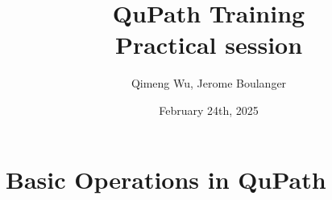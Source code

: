 \documentclass[a4paper,DIV=17,dvipsnames,headsepline]{scrartcl}
\begin{document}
\title{QuPath Training\\Practical session}

\author{Qimeng Wu, Jerome Boulanger}
\date{February 24th, 2025}

\maketitle

\tableofcontents





\newpage

\section{Basic Operations in QuPath}
\end{document}
